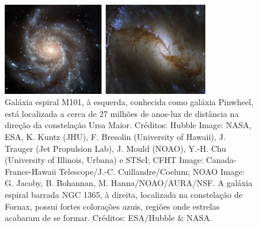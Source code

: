 \begin{figure}[h] 
  \centering 
  \includegraphics[width=0.8\textwidth]{Imagens/espirais.png} 
  \caption[Galáxia espiral M101 e espiral barrada NGC 1365.]{Galáxia espiral M101, à esquerda, conhecida como galáxia Pinwheel, está localizada a cerca de 27 milhões de anos-luz de distância na direção da constelação Ursa Maior. Créditos: Hubble Image: NASA, ESA, K. Kuntz (JHU), F. Bresolin (University of Hawaii), J. Trauger (Jet Propulsion Lab), J. Mould (NOAO), Y.-H. Chu (University of Illinois, Urbana) e STScI; CFHT Image: Canada-France-Hawaii Telescope/J.-C. Cuillandre/Coelum; NOAO Image: G. Jacoby, B. Bohannan, M. Hanna/NOAO/AURA/NSF. A galáxia espiral barrada NGC 1365, à direita, localizada na constelação de Fornax, possui fortes colorações azuis, regiões onde estrelas acabaram de se formar. Créditos: ESA/Hubble \& NASA.}
  \label{fig:espirais} 
\end{figure}

